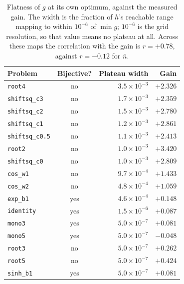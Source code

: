 \begin{table}[H]
\centering
\small
\caption{Flatness of $g$ at its own optimum, against the measured gain. The width is the fraction of $h$'s reachable range mapping to within $10^{-6}$ of $\min g$; $10^{-6}$ is the grid resolution, so that value means no plateau at all. Across these maps the correlation with the gain is $r=+0.78$, against $r=-0.12$ for $\bar n$.}
\label{tab:plateau}
\begin{tabular}{l c r r}
\toprule
Problem & Bijective? & Plateau width & Gain \\
\midrule
\texttt{root4} & no & $3.5\times10^{-3}$ & $+2.326$ \\
\texttt{shiftsq\_c3} & no & $1.7\times10^{-3}$ & $+2.359$ \\
\texttt{shiftsq\_c2} & no & $1.5\times10^{-3}$ & $+2.780$ \\
\texttt{shiftsq\_c1} & no & $1.2\times10^{-3}$ & $+2.861$ \\
\texttt{shiftsq\_c0.5} & no & $1.1\times10^{-3}$ & $+2.413$ \\
\texttt{root2} & no & $1.0\times10^{-3}$ & $+3.420$ \\
\texttt{shiftsq\_c0} & no & $1.0\times10^{-3}$ & $+2.809$ \\
\texttt{cos\_w1} & no & $9.7\times10^{-4}$ & $+1.433$ \\
\texttt{cos\_w2} & no & $4.8\times10^{-4}$ & $+1.059$ \\
\texttt{exp\_b1} & yes & $4.6\times10^{-4}$ & $+0.148$ \\
\midrule
\texttt{identity} & yes & $1.5\times10^{-6}$ & $+0.087$ \\
\texttt{mono3} & yes & $5.0\times10^{-7}$ & $+0.081$ \\
\texttt{mono5} & yes & $5.0\times10^{-7}$ & $-0.048$ \\
\texttt{root3} & no & $5.0\times10^{-7}$ & $+0.262$ \\
\texttt{root5} & no & $5.0\times10^{-7}$ & $+0.424$ \\
\texttt{sinh\_b1} & yes & $5.0\times10^{-7}$ & $+0.081$ \\
\bottomrule
\end{tabular}
\end{table}
